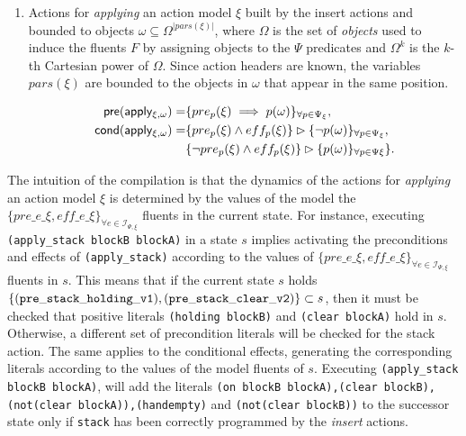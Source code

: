 \documentclass{article}
\newcommand{\pre}{\mathsf{pre}}     %
\newcommand{\cond}{\mathsf{cond}}   %
\begin{document}
\begin{itemize}
\begin{enumerate}
\item Actions for {\em applying} an action model $\xi$ built by the insert actions and bounded to objects $\omega\subseteq\Omega^{|pars(\xi)|}$, where $\Omega$ is the set of {\em objects} used to induce the fluents $F$ by assigning objects to the $\Psi$ predicates and $\Omega^k$ is the $k$-th Cartesian power of $\Omega$. Since action headers are known, the variables $pars(\xi)$ are bounded to the objects in $\omega$ that appear in the same position.

\begin{small}
\begin{align*}
\hspace*{7pt}\pre(\mathsf{apply_{\xi,\omega}})=&\{pre_{p}(\xi)\implies p(\omega)\}_{\forall p\in\Psi_\xi},\\
\cond(\mathsf{apply_{\xi,\omega}})=&\{pre_{p}(\xi)\wedge eff_{p}(\xi)\}\rhd\{\neg p(\omega)\}_{\forall p\in\Psi_\xi},\\
&\{\neg pre_{p}(\xi)\wedge eff_{p}(\xi)\}\rhd\{p(\omega)\}_{\forall p\in\Psi\xi}\}.
\end{align*}
\end{small}

\end{enumerate}
\end{itemize}

The intuition of the compilation is that the dynamics of the actions for {\em applying} an action model $\xi$ is determined by the values of the model the $\{pre\_e\_\xi, eff\_e\_\xi\}_{\forall e\in{\mathcal I}_{\Psi,\xi}}$ fluents in the current state. For instance, executing {\tt{\small (apply\_stack blockB blockA)}} in a state $s$ implies activating the preconditions and effects of {\tt{\small (apply\_stack)}} according to the values of $\{pre\_e\_\xi, eff\_e\_\xi\}_{\forall e\in{\mathcal I}_{\Psi,\xi}}$ fluents in $s$. This means that if the current state $s$ holds $\{{\tt\scriptsize (pre\_stack\_holding\_v1),(pre\_stack\_clear\_v2)}\} \subset s$, then it must be checked that positive literals {\tt{\small (holding blockB)}} and {\tt{\small (clear blockA)}} hold in $s$. Otherwise, a different set of precondition literals will be checked for the stack action. The same applies to the conditional effects, generating the corresponding literals according to the values of the model fluents of $s$. Executing {\tt{\small (apply\_stack blockB blockA)}}, will add the literals {\tt{\small (on blockB blockA),(clear blockB),(not(clear blockA)),(handempty)}} and {\tt{\small(not(clear blockB))}} to the successor state only if {\tt{\small stack}} has been correctly programmed by the {\em insert} actions.
\end{document}
